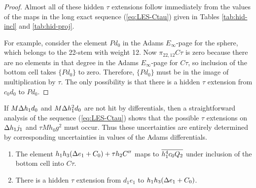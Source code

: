 \begin{proof}
Almost all of these hidden $\tau$ extensions follow immediately
from the values of the maps in the long exact sequence
(\ref{eq:LES-Ctau})
given in Tables \ref{tab:hid-incl} and \ref{tab:hid-proj}.

For example, 
consider the element $P d_0$
in the Adams $E_\infty$-page for the sphere, which 
belongs to the 22-stem with weight 12. 
Now $\pi_{22,12} C\tau$ is zero because there are 
no elements in that degree in the Adams $E_\infty$-page
for $C\tau$, so
inclusion of the bottom cell takes $\{ P d_0 \}$ to zero.
Therefore, $\{ P d_0 \}$ must be in the image of multiplication
by $\tau$.
The only possibility is that there is a hidden $\tau$
extension from $c_0 d_0$ to $P d_0$.
\end{proof}

\begin{remark}
\label{rem:t-Dh1j1}
If $M \Delta h_1 d_0$ and $M \Delta h_1^2 d_0$ are not hit by differentials,
then a straightforward analysis of the sequence
(\ref{eq:LES-Ctau})
shows that the possible $\tau$ extensions on $\Delta h_1 j_1$ and 
$\tau M h_0 g^2$ must occur.  Thus these uncertainties are entirely
determined by corresponding uncertainties in values of the Adams 
differentials.
\end{remark}

\begin{lemma}
\label{lem:t-d1e1}
\mbox{}
\begin{enumerate}
\item
{}
The element 
$h_1 h_3 (\Delta e_1 + C_0) + \tau h_2 C''$ maps to
$\overline{h_1^4 c_0 Q_2}$ 
under inclusion of the bottom cell into $C\tau$.
\item
{}
There is a hidden $\tau$ extension from $d_1 e_1$ to 
$h_1 h_3 (\Delta e_1 + C_0)$.
\end{enumerate}
\end{lemma}

